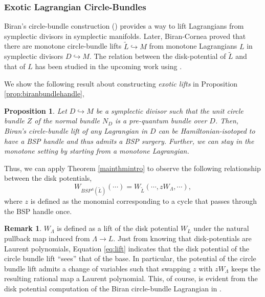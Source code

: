 \documentclass[11pt, oneside,dvipsnames]{amsart}
\renewcommand{\to}{\rightarrow}
\newcommand{\wt}{\widetilde}
\renewcommand{\to}{\rightarrow}
\newcommand{\<}{\langle}
\renewcommand{\>}{\rangle}
\renewcommand{\to}{\rightarrow}
\newtheorem*{prop*}{Proposition}
\theoremstyle{definition}
\theoremstyle{definition}
\newtheorem{remark}[Theorem]{Remark}
\numberwithin{equation}{subsection}
\begin{document}
\subsubsection{Exotic Lagrangian Circle-Bundles}\label{sub:exoticlift}

Biran's circle-bundle construction (\cite[\S 4]{b06}) provides a way to lift Lagrangians from symplectic divisors in symplectic manifolds. Later, Biran-Cornea \cite{bc09} proved that there are monotone circle-bundle lifts $\wt L \hookrightarrow M$ from monotone Lagrangians $L$ in symplectic divisors $D \hookrightarrow M$. The relation between the disk-potential of $\wt L$ and that of $L$ has been studied in the upcoming work \cite{DTVW} using \cite{bk13}.

We show the following result about constructing \textit{exotic lifts} in Proposition \ref{prop:biranbundlehandle},

\begin{prop*}
    Let $D\hookrightarrow M$ be a symplectic divisor such that the unit circle bundle $Z$ of the normal bundle $N_D$ is a pre-quantum bundle over $D$. Then, Biran's circle-bundle lift of any Lagrangian in $D$ can be Hamiltonian-isotoped to have a BSP handle and thus admits a BSP surgery. Further, we can stay in the monotone setting by starting from a monotone Lagrangian.
\end{prop*}
\noindent Thus, we can apply Theorem \ref{mainthmintro} to observe the following relationship between the disk potentials, 
\begin{equation} \label{eq:lift}
W_{BSP^{\Lambda}(\wt L)} (\cdots) = W_{\wt L} (\cdots, z W_\Lambda, \cdots),
\end{equation}
where $z$ is defined as the monomial corresponding to a cycle that passes through the BSP handle once. 

\begin{remark}
    $W_\Lambda$ is defined as a lift of the disk potential $W_L$ under the natural pullback map induced from $\Lambda \to L$. Just from knowing that disk-potentials are Laurent polynomials,  Equation \ref{eq:lift} indicates that the disk potential of the circle bundle lift ``sees'' that of the base. In particular, the potential of the circle bundle lift admits a change of variables such that swapping $z$ with $zW_\Lambda$ keeps the resulting rational map a Laurent polynomial. This, of course, is evident from the disk potential computation of the Biran circle-bundle Lagrangian in \cite{bk13,DTVW}.
\end{remark}
\end{document}
